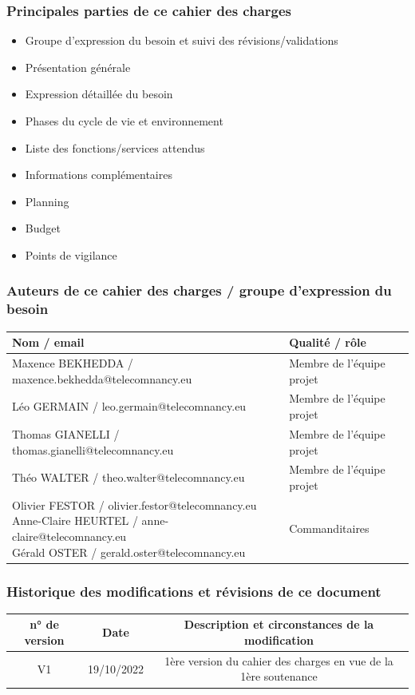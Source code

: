 \documentclass[11pt]{article}
\begin{document}
\subsubsection{Principales parties de ce cahier des charges}
\begin{itemize} 
\item Groupe d’expression du besoin et suivi des révisions/validations
\item Présentation générale
\item Expression détaillée du besoin
\item Phases du cycle de vie et environnement
\item Liste des fonctions/services attendus
\item Informations complémentaires
\item Planning
\item Budget
\item Points de vigilance
\end{itemize}

\subsubsection{Auteurs de ce cahier des charges / groupe d’expression du besoin}
\begin{center}
	\begin{tabular}{|l|l|}
	\hline
		\textbf{Nom / email}	& \textbf{Qualité / rôle}\\
		\hline
Maxence BEKHEDDA / maxence.bekhedda@telecomnancy.eu&
Membre de l’équipe projet\\
\hline
Léo GERMAIN / leo.germain@telecomnancy.eu&
Membre de l’équipe projet\\
\hline
Thomas GIANELLI / thomas.gianelli@telecomnancy.eu&
Membre de l’équipe projet\\
\hline
Théo WALTER / theo.walter@telecomnancy.eu&
Membre de l’équipe projet\\
\hline
\makecell[l]{
Olivier FESTOR / olivier.festor@telecomnancy.eu\\
Anne-Claire HEURTEL / anne-claire@telecomnancy.eu\\
Gérald OSTER / gerald.oster@telecomnancy.eu}&
Commanditaires\\
\hline
	\end{tabular}
\end{center}






\subsubsection{Historique des modifications et révisions de ce document}
\begin{center}
	\begin{tabular}{|c|c|c|}
	\hline
		\textbf{n° de version} &	\textbf{Date}	&\textbf{Description et circonstances de la modification}\\
		\hline
V1&	19/10/2022&	1ère version du cahier des charges en vue de la 1ère soutenance\\
\hline
	\end{tabular}
\end{center}
\end{document}
